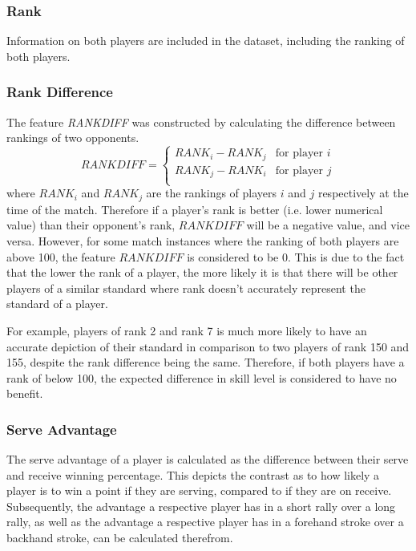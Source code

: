 \subsubsection{Rank} \label{rank}
Information on both players are included in the dataset, including the ranking of both players.

\subsubsection{Rank Difference} \label{rankdiff}
The feature \textit{RANKDIFF} was constructed by calculating the difference between rankings of two opponents.
$$
RANKDIFF = \begin{cases}
RANK_i - RANK_j &\text{for player $i$} \\
RANK_j - RANK_i &\text{for player $j$} \\
\end{cases}
$$
where $RANK_i$ and $RANK_j$ are the rankings of players $i$ and $j$ respectively at the time of the match. Therefore if a player's rank is better (i.e. lower numerical value) than their opponent's rank, $RANKDIFF$ will be a negative value, and vice versa. However, for some match instances where the ranking of both players are above 100, the feature $RANKDIFF$ is considered to be 0. This is due to the fact that the lower the rank of a player, the more likely it is that there will be other players of a similar standard where rank doesn't accurately represent the standard of a player.

For example, players of rank 2 and rank 7 is much more likely to have an accurate depiction of their standard in comparison to two players of rank 150 and 155, despite the rank difference being the same. Therefore, if both players have a rank of below 100, the expected difference in skill level is considered to have no benefit.

\subsubsection{Serve Advantage} \label{advantage}
The serve advantage of a player is calculated as the difference between their serve and receive winning percentage. This depicts the contrast as to how likely a player is to win a point if they are serving, compared to if they are on receive. Subsequently, the advantage a respective player has in a short rally over a long rally, as well as the advantage a respective player has in a forehand stroke over a backhand stroke, can be calculated therefrom.

